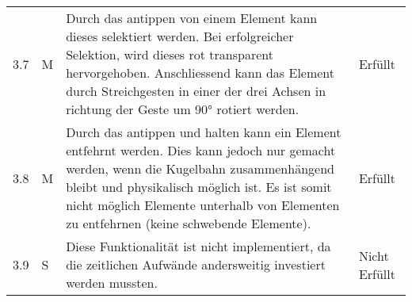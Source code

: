 \begin{longtable}{l l p{10cm} l}
	3.7 & M & Durch das antippen von einem Element kann dieses selektiert werden. Bei erfolgreicher Selektion, wird dieses rot transparent hervorgehoben. Anschliessend kann das Element durch Streichgesten in einer der drei Achsen in richtung der Geste um 90° rotiert werden. & Erfüllt \\
	3.8 & M & Durch das antippen und halten kann ein Element entfehrnt werden. Dies kann jedoch nur gemacht werden, wenn die Kugelbahn zusammenhängend bleibt und physikalisch möglich ist. Es ist somit nicht möglich Elemente unterhalb von Elementen zu entfehrnen (keine schwebende Elemente). & Erfüllt \\
	3.9 & S & Diese Funktionalität ist nicht implementiert, da die zeitlichen Aufwände andersweitig investiert werden mussten. & Nicht Erfüllt \\
\end{longtable}